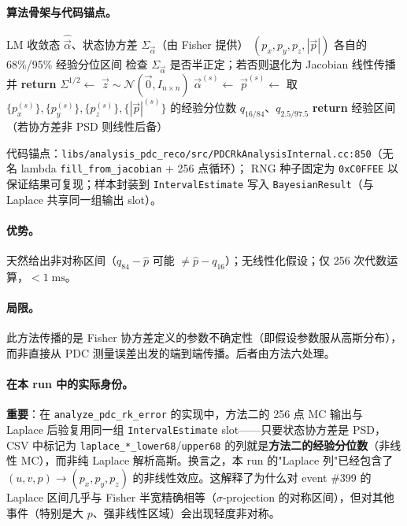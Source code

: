 \documentclass[a4paper, 11pt]{article}
\begin{document}
\paragraph{算法骨架与代码锚点。}

\begin{algorithm}[H]
\caption{方法二：参数空间 256 点蒙特卡洛传播}
\label{alg:mc_prop}
\begin{algorithmic}[1]
\Require LM 收敛态 $\hat{\vec{\alpha}}$、状态协方差 $\Sigma_{\vec{\alpha}}$（由 Fisher 提供）
\Ensure $(p_x, p_y, p_z, |\vec{p}|)$ 各自的 68\%/95\% 经验分位区间
\State 检查 $\Sigma_{\vec{\alpha}}$ 是否半正定；若否则退化为 Jacobian 线性传播并 \textbf{return}
\State $\Sigma^{1/2} \gets$  
  \State $\vec{z} \sim \mathcal{N}(\vec{0}, I_{n \times n})$
  \State $\vec{\alpha}^{(s)} \gets$ 
  \State $\vec{p}^{(s)} \gets$  
\EndFor
\State 取 $\{p_x^{(s)}\}, \{p_y^{(s)}\}, \{p_z^{(s)}\}, \{|\vec{p}|^{(s)}\}$ 的经验分位数 $q_{16/84}$、$q_{2.5/97.5}$
\State \textbf{return} 经验区间（若协方差非 PSD 则线性后备）
\end{algorithmic}
\end{algorithm}

代码锚点：\texttt{libs/analysis\_pdc\_reco/src/PDCRkAnalysisInternal.cc:850}（无名 lambda \texttt{fill\_from\_jacobian} + 256 点循环）；
RNG 种子固定为 \texttt{0xC0FFEE} 以保证结果可复现；样本封装到 \texttt{IntervalEstimate} 写入 \texttt{BayesianResult}（与 Laplace 共享同一组输出 slot）。

\paragraph{优势。}
天然给出非对称区间（$q_{84} - \hat{p}$ 可能 $\neq \hat{p} - q_{16}$）；无线性化假设；仅 256 次代数运算，$< 1\;\mathrm{ms}$。

\paragraph{局限。}
此方法传播的是 Fisher 协方差定义的参数不确定性（即假设参数服从高斯分布），而非直接从 PDC 测量误差出发的端到端传播。后者由方法六处理。

\paragraph{在本 run 中的实际身份。}
\textbf{重要}：在 \texttt{analyze\_pdc\_rk\_error} 的实现中，方法二的 256 点 MC 输出与 Laplace 后验复用同一组 \texttt{IntervalEstimate} slot——只要状态协方差是 PSD，CSV 中标记为 \texttt{laplace\_*\_lower68}/\texttt{upper68} 的列就是\textbf{方法二的经验分位数}（非线性 MC），而非纯 Laplace 解析高斯。换言之，本 run 的"Laplace 列"已经包含了 $(u,v,p) \to (p_x,p_y,p_z)$ 的非线性效应。这解释了为什么对 event \#399 的 Laplace 区间几乎与 Fisher 半宽精确相等（$\sigma$-projection 的对称区间），但对其他事件（特别是大 $p$、强非线性区域）会出现轻度非对称。
\end{document}
